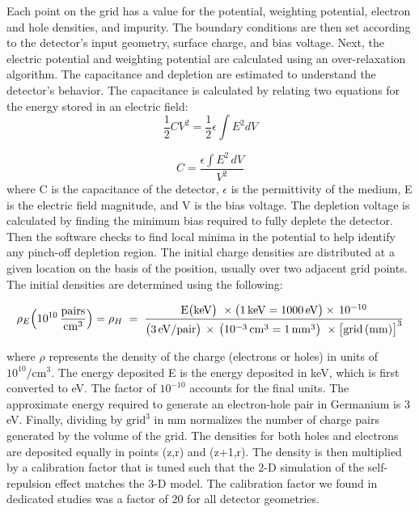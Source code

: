 Each point on the grid has a value for the potential, weighting potential, electron and hole densities, and impurity. The boundary conditions are then set according to the detector's input geometry, surface charge, and bias voltage. Next, the electric potential and weighting potential are calculated using an over-relaxation algorithm. The capacitance and depletion are estimated to understand the detector's behavior. The capacitance is calculated by relating two equations for the energy stored in an electric field:
\begin{equation}
    \frac{1}{2} C V^2 = \frac{1}{2} \epsilon \int E^2 dV
\end{equation}

\begin{equation}
    C = \frac{\epsilon \int E^2 \, dV}{V^2}
\end{equation}
where C is the capacitance of the detector, $\epsilon$ is the permittivity of the medium, E is the electric field magnitude, and V is the bias voltage. The depletion voltage is calculated by finding the minimum bias required to fully deplete the detector. Then the software checks to find local minima in the potential to help identify any pinch-off depletion region. The initial charge densities are distributed at a given location on the basis of the position, usually over two adjacent grid points. The initial densities are determined using the following:

\begin{equation}
\rho_E \Bigl(10^{10} \,\frac{\mathrm{pairs}}{\mathrm{cm^3}}\Bigr) = \rho_H  \;=\;
\frac{ \mathrm{E}\bigl(\mathrm{keV}\bigr)\ \times \bigl(1\,\mathrm{keV} = 1000\,\mathrm{eV}\bigr) \times\,10^{-10} }{\bigl(3\,\mathrm{eV/pair}\bigr)\,\times\, \bigl(10^{-3}\,\mathrm{cm}^{3} = 1\,\mathrm{mm}^3\bigr)\ \times \bigl[\text{grid}\,(\mathrm{mm})\bigr]^3 }
\label{eq:density_with_units}
\end{equation}

where $\rho$ represents the density of the charge (electrons or holes) in units of \(10^{10}/\text{cm}^3\). The energy deposited E is the energy deposited in keV, which is first converted to eV. The factor of $10^{-10}$ accounts for the final units. The approximate energy required to generate an electron-hole pair in Germanium is $3$ eV. Finally, dividing by \(\text{grid}^3\) in mm normalizes the number of charge pairs generated by the volume of the grid. The densities for both holes and electrons are deposited equally in points (z,r) and (z+1,r). The density is then multiplied by a calibration factor that is tuned such that the $2$-D simulation of the self-repulsion effect matches the $3$-D model. The calibration factor we found in dedicated studies was a factor of 20 for all detector geometries.

